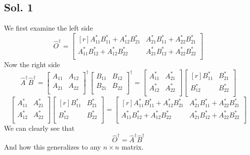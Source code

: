\documentclass{article}
\begin{document}
\subsection*{Sol. 1}
We first examine the left side
\[
\hat{O}^{†} = 
\begin{bmatrix*}[r]
A_{11}^{*}B_{11}^{*} + A_{12}^{*}B_{21}^{*} & A_{21}^{*}B_{11}^{*} + A_{22}^{*}B_{21}^{*} \\
A_{11}^{*}B_{12}^{*} + A_{12}^{*}B_{22}^{*} & A_{21}^{*}B_{12}^{*} + A_{22}^{*}B_{22}^{*} \\
\end{bmatrix*}
\]
Now the right side
\[
\hat{A}^{†} \hat{B}^{†} = 
\begin{bmatrix} 
A_{11} & A_{12} \\
A_{21} & A_{22} \\ 
\end{bmatrix}^{†}
\begin{bmatrix} 
B_{11} & B_{12} \\
B_{21} & B_{22} \\
\end{bmatrix}^{†} =
\begin{bmatrix} 
A_{11}^{*} & A_{21}^{*} \\
A_{12}^{*} & A_{22}^{*} \\
\end{bmatrix}
\begin{bmatrix*}[r]
B_{11}^{*} & B_{21}^{*} \\
B_{12}^{*} & B_{22}^{*} \\
\end{bmatrix*} 
\]
\[
\begin{bmatrix} 
A_{11}^{*} & A_{21}^{*} \\
A_{12}^{*} & A_{22}^{*} \\
\end{bmatrix}
\begin{bmatrix*}[r]
B_{11}^{*} & B_{21}^{*} \\
B_{12}^{*} & B_{22}^{*} \\
\end{bmatrix*} = 
\begin{bmatrix*}[r]
A_{11}^{*}B_{11}^{*} + A_{12}^{*}B_{21}^{*} & A_{21}^{*}B_{11}^{*} + A_{22}^{*}B_{21}^{*} \\
A_{11}^{*}B_{12}^{*} + A_{12}^{*}B_{22}^{*} & A_{21}^{*}B_{12}^{*} + A_{22}^{*}B_{22}^{*} \\
\end{bmatrix*}
\]
We can clearly see that
\[
\hat{O}^{†} = \hat{A}^{†} \hat{B}^{†}
\]
And how this generalizes to any $n×n$ matrix.
\end{document}
